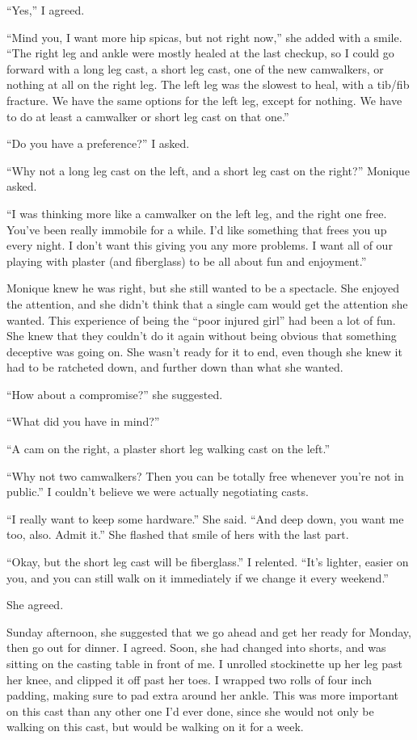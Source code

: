 ``Yes,'' I agreed.

``Mind you, I want more hip spicas, but not right now,'' she added with a smile. ``The right
leg and ankle were mostly healed at the last checkup, so I could go forward with a long leg
cast, a short leg cast, one of the new camwalkers, or nothing at all on the right leg. The left
leg was the slowest to heal, with a tib/fib fracture. We have the same options for the left leg,
except for nothing. We have to do at least a camwalker or short leg cast on that one.''

``Do you have a preference?'' I asked.

``Why not a long leg cast on the left, and a short leg cast on the right?'' Monique asked.

``I was thinking more like a camwalker on the left leg, and the right one free. You've been
really immobile for a while. I'd like something that frees you up every night. I don't want this
giving you any more problems. I want all of our playing with plaster (and fiberglass) to be all
about fun and enjoyment.''

Monique knew he was right, but she still wanted to be a spectacle. She enjoyed the
attention, and she didn't think that a single cam would get the attention she wanted. This
experience of being the ``poor injured girl'' had been a lot of fun. She knew that they couldn't
do it again without being obvious that something deceptive was going on. She wasn't ready for it
to end, even though she knew it had to be ratcheted down, and further down than what she wanted.

``How about a compromise?'' she suggested.

``What did you have in mind?''

``A cam on the right, a plaster short leg walking cast on the left.''

``Why not two camwalkers? Then you can be totally free whenever you're not in public.'' I
couldn't believe we were actually negotiating casts.

``I really want to keep some hardware.'' She said. ``And deep down, you want me too, also.
Admit it.'' She flashed that smile of hers with the last part.

``Okay, but the short leg cast will be fiberglass.'' I relented. ``It's lighter, easier on
you, and you can still walk on it immediately if we change it every weekend.''

She agreed.

Sunday afternoon, she suggested that we go ahead and get her ready for Monday, then go out
for dinner. I agreed. Soon, she had changed into shorts, and was sitting on the casting table in
front of me. I unrolled stockinette up her leg past her knee, and clipped it off past her toes.
I wrapped two rolls of four inch padding, making sure to pad extra around her ankle. This was
more important on this cast than any other one I'd ever done, since she would not only be
walking on this cast, but would be walking on it for a week.

